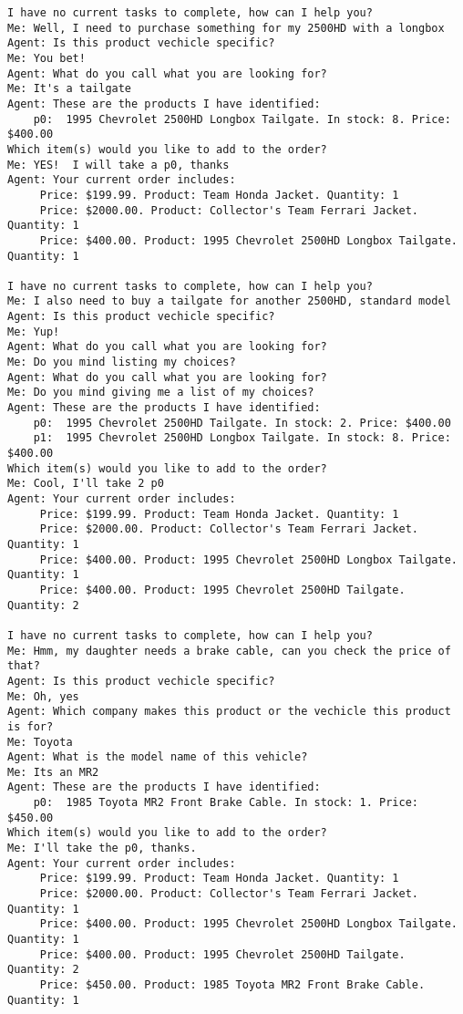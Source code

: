 \documentclass[11pt, titlepage]{article}
\begin{document}
\begin{lstlisting}
I have no current tasks to complete, how can I help you?
Me: Well, I need to purchase something for my 2500HD with a longbox
Agent: Is this product vechicle specific?
Me: You bet!
Agent: What do you call what you are looking for?
Me: It's a tailgate
Agent: These are the products I have identified:
	p0:	 1995 Chevrolet 2500HD Longbox Tailgate. In stock: 8. Price: $400.00
Which item(s) would you like to add to the order?
Me: YES!  I will take a p0, thanks
Agent: Your current order includes:
	 Price: $199.99. Product: Team Honda Jacket. Quantity: 1
	 Price: $2000.00. Product: Collector's Team Ferrari Jacket. Quantity: 1
	 Price: $400.00. Product: 1995 Chevrolet 2500HD Longbox Tailgate. Quantity: 1

I have no current tasks to complete, how can I help you?
Me: I also need to buy a tailgate for another 2500HD, standard model
Agent: Is this product vechicle specific?
Me: Yup!
Agent: What do you call what you are looking for?
Me: Do you mind listing my choices?
Agent: What do you call what you are looking for?
Me: Do you mind giving me a list of my choices?
Agent: These are the products I have identified:
	p0:	 1995 Chevrolet 2500HD Tailgate. In stock: 2. Price: $400.00
	p1:	 1995 Chevrolet 2500HD Longbox Tailgate. In stock: 8. Price: $400.00
Which item(s) would you like to add to the order?
Me: Cool, I'll take 2 p0
Agent: Your current order includes:
	 Price: $199.99. Product: Team Honda Jacket. Quantity: 1
	 Price: $2000.00. Product: Collector's Team Ferrari Jacket. Quantity: 1
	 Price: $400.00. Product: 1995 Chevrolet 2500HD Longbox Tailgate. Quantity: 1
	 Price: $400.00. Product: 1995 Chevrolet 2500HD Tailgate. Quantity: 2

I have no current tasks to complete, how can I help you?
Me: Hmm, my daughter needs a brake cable, can you check the price of that?
Agent: Is this product vechicle specific?
Me: Oh, yes
Agent: Which company makes this product or the vechicle this product is for?
Me: Toyota
Agent: What is the model name of this vehicle?
Me: Its an MR2
Agent: These are the products I have identified:
	p0:	 1985 Toyota MR2 Front Brake Cable. In stock: 1. Price: $450.00
Which item(s) would you like to add to the order?
Me: I'll take the p0, thanks.
Agent: Your current order includes:
	 Price: $199.99. Product: Team Honda Jacket. Quantity: 1
	 Price: $2000.00. Product: Collector's Team Ferrari Jacket. Quantity: 1
	 Price: $400.00. Product: 1995 Chevrolet 2500HD Longbox Tailgate. Quantity: 1
	 Price: $400.00. Product: 1995 Chevrolet 2500HD Tailgate. Quantity: 2
	 Price: $450.00. Product: 1985 Toyota MR2 Front Brake Cable. Quantity: 1


\end{lstlisting}
\end{document}
